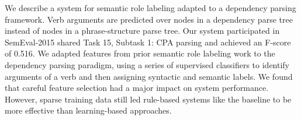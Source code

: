 We describe a system for semantic role labeling adapted to a dependency parsing framework. Verb arguments are predicted over nodes in a dependency parse tree instead of nodes in a phrase-structure parse tree. Our system participated in SemEval-2015 shared Task 15, Subtask 1: CPA parsing and achieved an F-score of 0.516. We adapted features from prior semantic role labeling work to the dependency parsing paradigm, using a series of supervised classifiers to identify arguments of a verb and then assigning syntactic and semantic labels. We found that careful feature selection had a major impact on system performance. However, sparse training data still led rule-based systems like the baseline to be more effective than learning-based approaches.
